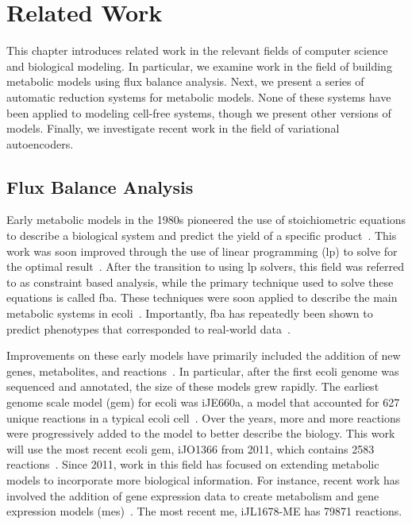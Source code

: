 \chapter{Related Work} \label{chap:rw}
This chapter introduces related work in the relevant fields of computer science and biological modeling.
In particular, we examine work in the field of building metabolic models using flux balance analysis.
Next, we present a series of automatic reduction systems for metabolic models.
None of these systems have been applied to modeling cell-free systems, though we present other versions of models.
Finally, we investigate recent work in the field of variational autoencoders.


\section{Flux Balance Analysis}
Early metabolic models in the 1980s pioneered the use of stoichiometric equations to describe a biological system and predict the yield of a specific product~\cite{papoutsakis1984equations}.
This work was soon improved through the use of linear programming (\gls{lp}) to solve for the optimal result~\cite{fell1986fat}.
After the transition to using \gls{lp} solvers, this field was referred to as constraint based analysis, while the primary technique used to solve these equations is called \gls{fba}.
These techniques were soon applied to describe the main metabolic systems in \gls{ecoli}~\cite{majewski1990simple}.
Importantly, \gls{fba} has repeatedly been shown to predict phenotypes that corresponded to real-world data~\cite{varma1994stoichiometric, edwards2001silico, segre2002analysis, bordbar2014constraint}.

Improvements on these early models have primarily included the addition of new genes, metabolites, and reactions~\cite{varma1993metabolic}.
In particular, after the first \gls{ecoli} genome was sequenced and annotated, the size of these models grew rapidly.
The earliest genome scale model (\gls{gem}) for \gls{ecoli} was iJE660a, a model that accounted for 627 unique reactions in a typical \gls{ecoli} cell~\cite{edwards2000escherichia}.
Over the years, more and more reactions were progressively added to the model to better describe the biology.
This work will use the most recent \gls{ecoli} \gls{gem}, iJO1366 from 2011, which contains 2583 reactions~\cite{orth2011comprehensive}.
Since 2011, work in this field has focused on extending metabolic models to incorporate more biological information.
For instance, recent work has involved the addition of gene expression data to create metabolism and gene expression models (\glspl{me})~\cite{lloyd2017cobrame}.
The most recent \gls{me}, iJL1678-ME has 79871 reactions.

